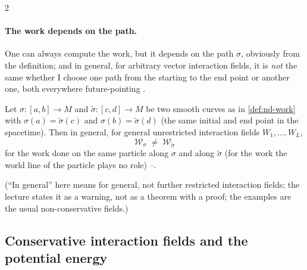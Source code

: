 \begin{paracol}{2}
\paragraph{The work depends on the path.} One can always compute the work, but it depends on the path $\sigma$, obviously from the definition; and in general, for arbitrary vector interaction fields, it is \emph{not} the same whether I choose one path from the starting to the end point or another one, both everywhere future-pointing .
\begin{proposition}\label{prop:nd-pathdep}
Let $\sigma\colon[a,b]\to M$ and $\tilde\sigma\colon[c,d]\to M$ be two smooth curves as in \cref{def:nd-work} with $\sigma(a)=\tilde\sigma(c)$ and $\sigma(b)=\tilde\sigma(d)$ (the same initial and end point in the spacetime). Then in general, for general unrestricted interaction fields $W_1,\dots,W_L$,
\[
  \mathcal W_\sigma\;\neq\;\mathcal W_{\tilde\sigma}
\]
for the work done on the same particle along $\sigma$ and along $\tilde\sigma$ (for the work the world line of the particle plays no role) --.
\end{proposition}
(``In general'' here means for general, not further restricted interaction fields; the lecture states it as a warning, not as a theorem with a proof; the examples are the usual non-conservative fields.)

\subsection{Conservative interaction fields and the potential energy}\label{ssec:nd-potential}


\end{paracol}
